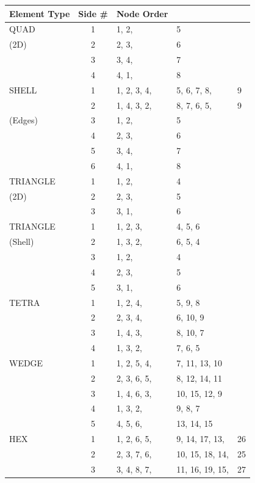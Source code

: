 \begin{table}
\begin{center}
\begin{tabular}{l|c|lll}
\hline \textbf{Element Type} & \textbf{Side \#}& \textbf{Node Order} \\ \hline
QUAD   & 1 & 1, 2, & 5 \\ 
(2D)   & 2 & 2, 3, & 6 \\ 
       & 3 & 3, 4, & 7 \\ 
       & 4 & 4, 1, & 8 \\ \hline
SHELL  & 1 & 1, 2, 3, 4, & 5, 6, 7, 8, & 9 \\ 
       & 2 & 1, 4, 3, 2, & 8, 7, 6, 5, & 9 \\ 
(Edges)& 3 & 1, 2, & 5 \\ 
       & 4 & 2, 3, & 6 \\ 
       & 5 & 3, 4, & 7 \\ 
       & 6 & 4, 1, & 8 \\ \hline
TRIANGLE&1 & 1, 2, & 4 \\ 
(2D)   & 2 & 2, 3, & 5 \\ 
       & 3 & 3, 1, & 6 \\ \hline
TRIANGLE& 1 & 1, 2, 3, & 4, 5, 6 \\ 
(Shell)& 2 & 1, 3, 2, & 6, 5, 4 \\ 
       & 3 & 1, 2,    & 4  \\
       & 4 & 2, 3,    & 5 \\
       & 5 & 3, 1,    & 6 \\ \hline
TETRA  & 1 & 1, 2, 4, & 5, 9, 8 \\ 
       & 2 & 2, 3, 4, & 6, 10, 9 \\ 
       & 3 & 1, 4, 3, & 8, 10, 7 \\ 
       & 4 & 1, 3, 2, & 7, 6, 5 \\ \hline
WEDGE  & 1 & 1, 2, 5, 4, & 7, 11, 13, 10 \\ 
       & 2 & 2, 3, 6, 5, & 8, 12, 14, 11 \\ 
       & 3 & 1, 4, 6, 3, & 10, 15, 12, 9 \\ 
       & 4 & 1, 3, 2, & 9, 8, 7 \\ 
       & 5 & 4, 5, 6, & 13, 14, 15 \\ \hline
HEX    & 1 & 1, 2, 6, 5, & 9, 14, 17, 13, & 26 \\ 
       & 2 & 2, 3, 7, 6, & 10, 15, 18, 14, & 25 \\ 
       & 3 & 3, 4, 8, 7, & 11, 16, 19, 15, & 27 \\ 

\end{tabular}
\end{center}
\end{table}
